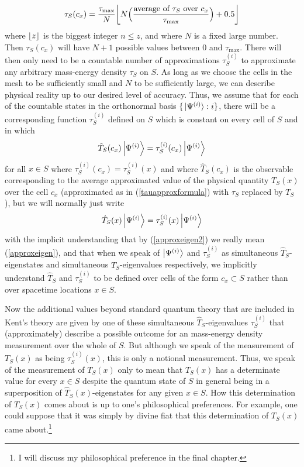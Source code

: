     \begin{equation}\label{tauapproxformula}
    \tau_S(c_x)=\frac{\tau_{\text{max}}}{N}\floor*{N\Big(\frac{\text{average of }\tau_S\text{ over }c_x}{\tau_{\text{max}}}\Big)+0.5}
    \end{equation}
    where $\floor*{z}$ is the biggest integer $n\leq z$, and where $N$ is a fixed large number. Then $\tau_S(c_x)$ will have $N+1$ possible values between $0$ and $\tau_{\text{max}}$.  There will then only need to be a countable number of approximations $\tau_S^{(i)}$ to approximate any arbitrary mass-energy density $\tau_S$ on $S$.  As long as we choose the cells in the mesh to be sufficiently small and $N$ to be sufficiently large, we can describe physical reality up to our desired level of accuracy. Thus, we assume that for each of the countable states in the orthonormal basis $\{\ket*{\Psi^{(i)}}:i\}$, there will be a corresponding function $\tau_S^{(i)}$ defined on $S$ which is constant on every cell of $S$ and in which 
\begin{equation}\label{approxeigen}
\hat{T}_S(c_x)\ket{\Psi^{(i)}}= \tau_S^{(i)}(c_x)\ket{\Psi^{(i)}}
\end{equation} 
for all $x\in S$ where $ \tau_S^{(i)}(c_x)= \tau_S^{(i)}(x)$ and where $\hat{T}_S(c_x)$ is the observable corresponding to the average approximated value of the physical quantity $T_S(x)$ over the cell $c_x$ (approximated as in (\ref{tauapproxformula}) with $\tau_S$ replaced by $T_S$), but we will normally just write
\begin{equation}\label{approxeigen2}
  \hat{T}_S(x)\ket{\Psi^{(i)}}= \tau_S^{(i)}(x)\ket{\Psi^{(i)}}
  \end{equation}
with the implicit understanding that by (\ref{approxeigen2}) we really mean (\ref{approxeigen}), and that when we speak of $\ket{\Psi^{(i)}}$ and $\tau_S^{(i)}$ as simultaneous $\hat{T}_S$-eigenstates and simultaneous $\hat{T}_S$-eigenvalues respectively, we implicitly understand $\hat{T}_S$ and $\tau_S^{(i)}$ to be defined over cells of the form $c_x\subset S$ rather than over spacetime locations $x\in S$.

Now the additional values beyond standard quantum theory that are included in Kent's theory are given by one of these simultaneous $\hat{T}_S$-eigenvalues $\tau_S^{(i)}$ that (approximately) describe a possible outcome for an mass-energy density measurement over the whole of $S$.  But although we speak of the measurement of $T_S(x)$ as being $\tau_S^{(i)}(x)$, this is only a notional measurement. Thus, we speak of the measurement of  $T_S(x)$ only to mean that $T_S(x)$ has a determinate value for every $x\in S$ despite the quantum state of $S$ in general being in a superposition of $\hat{T}_S(x)$-eigenstates for any given $x\in S$. How this determination of $T_S(x)$ comes about is up to one's philosophical preferences. For example, one could suppose that it was simply by divine fiat that this determination  of $T_S(x)$ came about.\footnote{I will discuss my philosophical preference in the final chapter.} 

